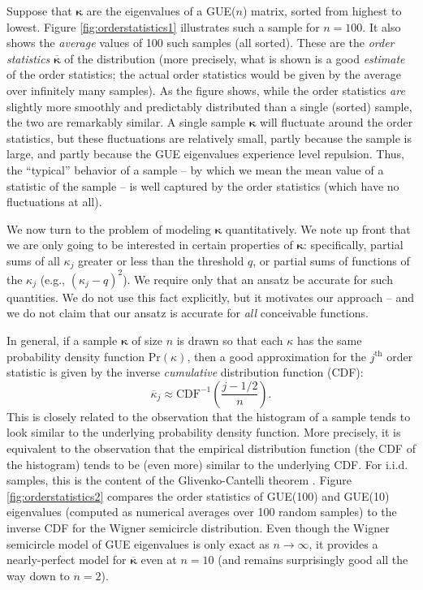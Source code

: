 \documentclass[aps,pra, twocolumn]{revtex4-1}
\newcommand{\bvec}[1]{\boldsymbol{#1}}
\begin{document}
Suppose that $\bvec{\kappa}$ are the eigenvalues of a GUE($n$) matrix, sorted from highest to lowest.  Figure \ref{fig:orderstatistics1} illustrates such a sample for $n=100$.  It also shows the \emph{average} values of 100 such samples (all sorted).  These are the \emph{order statistics} $\overline{\bvec{\kappa}}$ of the distribution (more precisely, what is shown is a good \emph{estimate} of the order statistics; the actual order statistics would be given by the average over infinitely many samples).  As the figure shows, while the order statistics \emph{are} slightly more smoothly and predictably distributed than a single (sorted) sample, the two are remarkably similar.  A single sample $\bvec{\kappa}$ will fluctuate around the order statistics, but these fluctuations are relatively small, partly because the sample is large, and partly because the GUE eigenvalues experience level repulsion.  Thus, the ``typical'' behavior of a sample -- by which we mean the mean value of a statistic of the sample -- is well captured by the order statistics (which have no fluctuations at all).

We now turn to the problem of modeling $\bvec{\kappa}$ quantitatively.  We note up front that we are only going to be interested in certain properties of $\bvec{\kappa}$:  specifically, partial sums of all $\kappa_j$ greater or less than the threshold $q$, or partial sums of functions of the $\kappa_j$ (e.g., $(\kappa_j-q)^2$).  We require only that an ansatz be accurate for such quantities.  We do not use this fact explicitly, but it motivates our approach -- and we do not claim that our ansatz is accurate for \emph{all} conceivable functions.

In general, if a sample $\bvec{\kappa}$ of size $n$ is drawn so that each $\kappa$ has the same probability density 
function $\mathrm{Pr}(\kappa)$, then a good approximation for the $j^{\mathrm{th}}$ order statistic is given by the inverse 
\emph{cumulative} distribution function (CDF):
\begin{equation}
\overline{\kappa}_j \approx \mathrm{CDF}^{-1}\left(\frac{j-1/2}{n}\right).
\end{equation}
This is closely related to the observation that the histogram of a sample tends to look similar to the underlying probability density function.  More precisely, it is equivalent to the observation that the empirical distribution function (the CDF of the histogram) tends to be (even more) similar to the underlying CDF.  For i.i.d. samples, this is the content of the Glivenko-Cantelli theorem \cite{VanderVaart2000}.  Figure \ref{fig:orderstatistics2} compares the order statistics of GUE(100) and GUE(10) eigenvalues (computed as numerical averages over 100 random samples) to the inverse CDF for the Wigner semicircle distribution.  Even though the Wigner semicircle model of GUE eigenvalues is only exact as $n\to\infty$, it provides a nearly-perfect model for $\overline{\bvec{\kappa}}$ even at $n=10$ (and remains surprisingly good all the way down to $n=2$).
\end{document}
